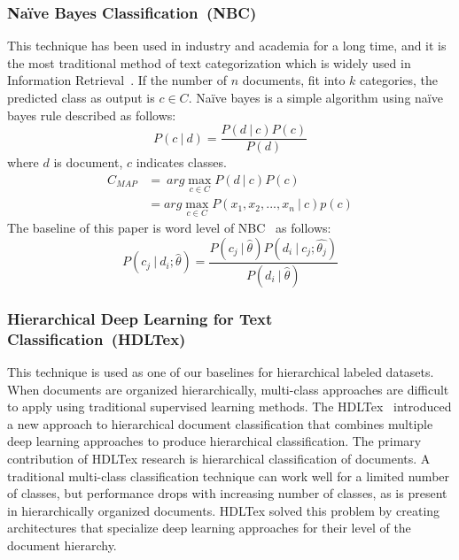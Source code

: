 \documentclass[sigconf, final]{acmart}
\newcommand\given[1][]{\:#1\vert\:}
\begin{document}
\subsubsection{Na\"{i}ve Bayes Classification~(NBC)}\label{me_NB}
This technique has been used in industry and academia for a long time, and it is the most traditional method of text categorization which is widely used in Information Retrieval~\cite{manning2008introduction}. If the number of $n$ documents, fit into $k$ categories, the predicted class as output is $c \in C$. Na\"{i}ve bayes is a simple algorithm using na\"{i}ve bayes rule described  as follows:
\begin{equation}
P(c \given d) = \frac{P(d \given c)P(c)}{P(d)}
\end{equation}
where $d$ is document, $c$ indicates classes.
\begin{equation} \label{eq1}
\begin{split}
C_{MAP} &=~  arg \max_{c \in C} P(d \given c)P(c) \\&= arg \max_{c\in C} P(x_1,x_2,...,x_n \given c) p(c)
\end{split}
\end{equation}
The baseline of this paper is word level of NBC~\cite{kim2006some} as follows:
\begin{equation}
    P(c_j \given d_i;\hat{\theta}) = \frac{P(c_j \given \hat{\theta})P(d_i \given c_j ; \hat{\theta_j})}{P(d_i \given \hat{\theta})}
\end{equation}\subsubsection{Hierarchical Deep Learning for Text Classification~(HDLTex)} This technique is used as one of our baselines for hierarchical labeled datasets. When documents are organized hierarchically, multi-class approaches are difficult to apply using traditional supervised learning methods. The HDLTex~\cite{kowsari2017HDLTex} introduced a new approach to hierarchical document classification that combines multiple deep learning approaches to produce hierarchical classification. The primary contribution of HDLTex research is hierarchical classification of documents.  A traditional multi-class classification technique can work well for a limited number of classes, but performance drops with increasing number of classes, as is present in hierarchically organized documents. HDLTex solved this problem by creating architectures that specialize deep learning approaches for their level of the document hierarchy.
\end{document}
